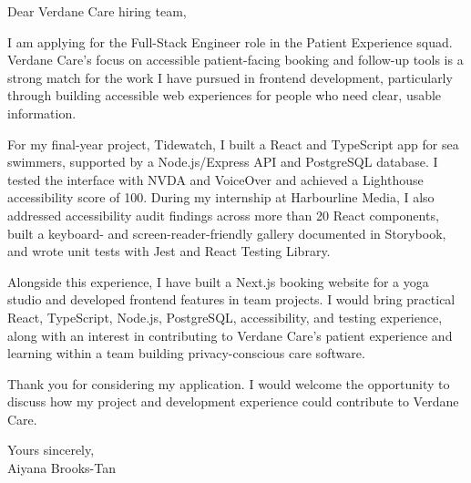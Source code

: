\documentclass[11pt,a4paper]{article}
\begin{document}
Dear Verdane Care hiring team,

I am applying for the Full-Stack Engineer role in the Patient Experience squad. Verdane Care's focus on accessible patient-facing booking and follow-up tools is a strong match for the work I have pursued in frontend development, particularly through building accessible web experiences for people who need clear, usable information.

For my final-year project, Tidewatch, I built a React and TypeScript app for sea swimmers, supported by a Node.js/Express API and PostgreSQL database. I tested the interface with NVDA and VoiceOver and achieved a Lighthouse accessibility score of 100. During my internship at Harbourline Media, I also addressed accessibility audit findings across more than 20 React components, built a keyboard- and screen-reader-friendly gallery documented in Storybook, and wrote unit tests with Jest and React Testing Library.

Alongside this experience, I have built a Next.js booking website for a yoga studio and developed frontend features in team projects. I would bring practical React, TypeScript, Node.js, PostgreSQL, accessibility, and testing experience, along with an interest in contributing to Verdane Care's patient experience and learning within a team building privacy-conscious care software.

Thank you for considering my application. I would welcome the opportunity to discuss how my project and development experience could contribute to Verdane Care.

Yours sincerely,\\
Aiyana Brooks-Tan
\end{document}
